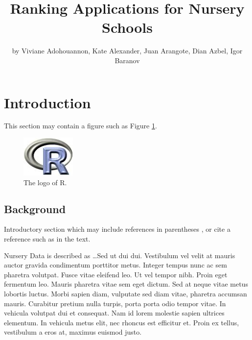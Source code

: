 \title{Ranking Applications for Nursery Schools}
\author{by Viviane Adohouannon, Kate Alexander, Juan Arangote, Dian Azbel, Igor Baranov}

\maketitle



\hypertarget{introduction}{%
\section{Introduction}\label{introduction}}

This section may contain a figure such as Figure \ref{figure:rlogo}.

\begin{figure}[htbp]
  \centering
  \includegraphics{Rlogo}
  \caption{The logo of R.}
  \label{figure:rlogo}
\end{figure}

\hypertarget{background}{%
\subsection{Background}\label{background}}

Introductory section which may include references in parentheses
\citep{R}, or cite a reference such as \citet{R} in the text.

Nursery Data is described as \ldots{}Sed ut dui dui. Vestibulum vel
velit at mauris auctor gravida condimentum porttitor metus. Integer
tempus nunc ac sem pharetra volutpat. Fusce vitae eleifend leo. Ut vel
tempor nibh. Proin eget fermentum leo. Mauris pharetra vitae sem eget
dictum. Sed at neque vitae metus lobortis luctus. Morbi sapien diam,
vulputate sed diam vitae, pharetra accumsan mauris. Curabitur pretium
nulla turpis, porta porta odio tempor vitae. In vehicula volutpat dui et
consequat. Nam id lorem molestie sapien ultrices elementum. In vehicula
metus elit, nec rhoncus est efficitur et. Proin ex tellus, vestibulum a
eros at, maximus euismod justo.

